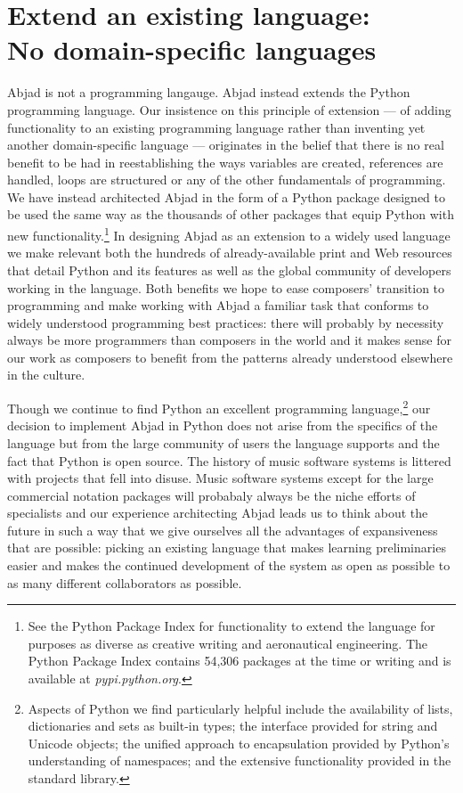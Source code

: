 \documentclass{article}
\begin{document}
\section{Extend an existing language: \\ No domain-specific languages}

Abjad is not a programming langauge. Abjad instead extends the Python
programming language. Our insistence on this principle of extension --- of
adding functionality to an existing programming language rather than inventing
yet another domain-specific language --- originates in the belief that there is
no real benefit to be had in reestablishing the ways variables are created,
references are handled, loops are structured or any of the other fundamentals
of programming. We have instead architected Abjad in the form of a Python
package designed to be used the same way as the thousands of other packages
that equip Python with new functionality.\footnote{See the Python Package Index
for functionality to extend the language for purposes as diverse as creative
writing and aeronautical engineering. The Python Package Index contains 54,306
packages at the time or writing and is available at \textit{pypi.python.org}.}
In designing Abjad as an extension to a widely used language we make relevant
both the hundreds of already-available print and Web resources that detail
Python and its features as well as the global community of developers working
in the language. Both benefits we hope to ease composers' transition to
programming and make working with Abjad a familiar task that conforms to widely
understood programming best practices: there will probably by necessity always
be more programmers than composers in the world and it makes sense for our work
as composers to benefit from the patterns already understood elsewhere in the
culture.

Though we continue to find Python an excellent programming
language,\footnote{Aspects of Python we find particularly helpful include the
availability of lists, dictionaries and sets as built-in types; the interface
provided for string and Unicode objects; the unified approach to encapsulation
provided by Python's understanding of namespaces; and the extensive
functionality provided in the standard library.} our decision to implement
Abjad in Python does not arise from the specifics of the language but from the
large community of users the language supports and the fact that Python is open
source. The history of music software systems is littered with projects that
fell into disuse. Music software systems except for the large commercial
notation packages will probabaly always be the niche efforts of specialists and
our experience architecting Abjad leads us to think about the future in such a
way that we give ourselves all the advantages of expansiveness that are
possible: picking an existing language that makes learning preliminaries
easier and makes the continued development of the system as open as possible to
as many different collaborators as possible.
\end{document}
